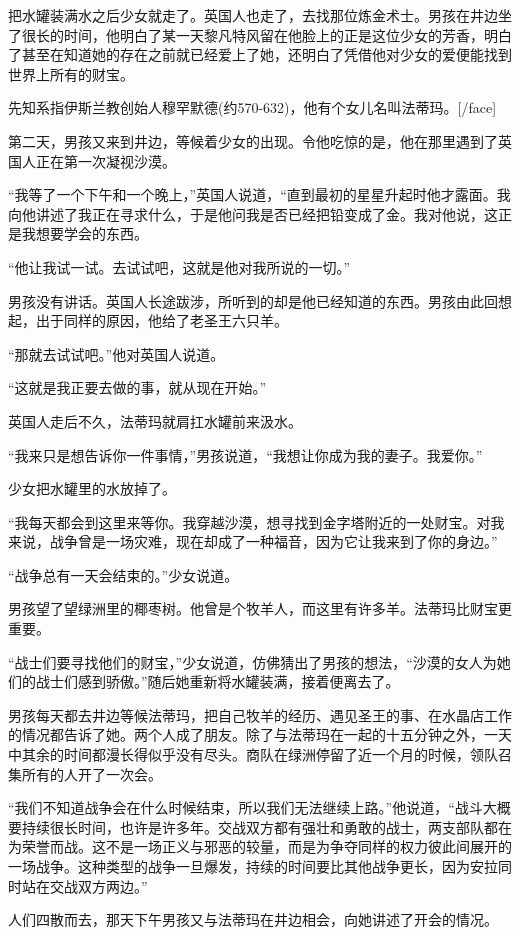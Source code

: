 \documentclass[twoside,openany]{book}
\begin{document}
把水罐装满水之后少女就走了。英国人也走了，去找那位炼金术士。男孩在井边坐了很长的时间，他明白了某一天黎凡特风留在他脸上的正是这位少女的芳香，明白了甚至在知道她的存在之前就已经爱上了她，还明白了凭借他对少女的爱便能找到世界上所有的财宝。

先知系指伊斯兰教创始人穆罕默德(约570-632)，他有个女儿名叫法蒂玛。[/face]

第二天，男孩又来到井边，等候着少女的出现。令他吃惊的是，他在那里遇到了英国人正在第一次凝视沙漠。

“我等了一个下午和一个晚上，”英国人说道，“直到最初的星星升起时他才露面。我向他讲述了我正在寻求什么，于是他问我是否已经把铅变成了金。我对他说，这正是我想要学会的东西。

“他让我试一试。去试试吧，这就是他对我所说的一切。”

男孩没有讲话。英国人长途跋涉，所听到的却是他已经知道的东西。男孩由此回想起，出于同样的原因，他给了老圣王六只羊。

“那就去试试吧。”他对英国人说道。

“这就是我正要去做的事，就从现在开始。”

英国人走后不久，法蒂玛就肩扛水罐前来汲水。

“我来只是想告诉你一件事情，”男孩说道，“我想让你成为我的妻子。我爱你。”

少女把水罐里的水放掉了。

“我每天都会到这里来等你。我穿越沙漠，想寻找到金字塔附近的一处财宝。对我来说，战争曾是一场灾难，现在却成了一种福音，因为它让我来到了你的身边。”

“战争总有一天会结束的。”少女说道。

男孩望了望绿洲里的椰枣树。他曾是个牧羊人，而这里有许多羊。法蒂玛比财宝更重要。

“战士们要寻找他们的财宝，”少女说道，仿佛猜出了男孩的想法，“沙漠的女人为她们的战士们感到骄傲。”随后她重新将水罐装满，接着便离去了。

男孩每天都去井边等候法蒂玛，把自己牧羊的经历、遇见圣王的事、在水晶店工作的情况都告诉了她。两个人成了朋友。除了与法蒂玛在一起的十五分钟之外，一天中其余的时间都漫长得似乎没有尽头。商队在绿洲停留了近一个月的时候，领队召集所有的人开了一次会。

“我们不知道战争会在什么时候结束，所以我们无法继续上路。”他说道，“战斗大概要持续很长时间，也许是许多年。交战双方都有强壮和勇敢的战士，两支部队都在为荣誉而战。这不是一场正义与邪恶的较量，而是为争夺同样的权力彼此间展开的一场战争。这种类型的战争一旦爆发，持续的时间要比其他战争更长，因为安拉同时站在交战双方两边。”

人们四散而去，那天下午男孩又与法蒂玛在井边相会，向她讲述了开会的情况。
\end{document}
